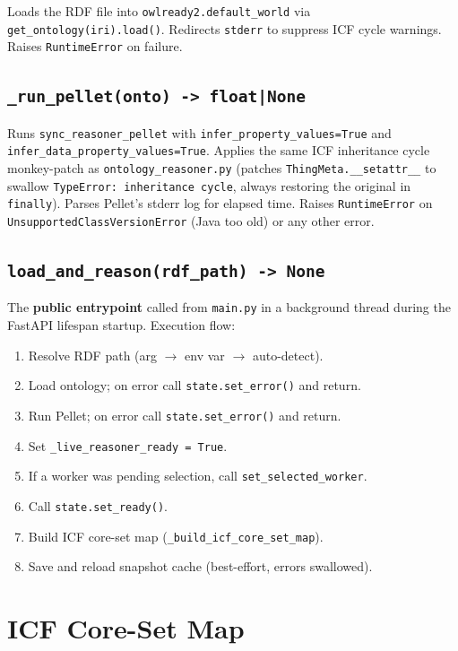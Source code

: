 ﻿\documentclass[12pt,a4paper]{article}
\begin{document}
Loads the RDF file into \texttt{owlready2.default\_world} via \texttt{get\_ontology(iri).load()}. Redirects \texttt{stderr} to suppress ICF cycle warnings. Raises \texttt{RuntimeError} on failure.

\subsection{\texttt{\_run\_pellet(onto) -> float|None}}

Runs \texttt{sync\_reasoner\_pellet} with \texttt{infer\_property\_values=True} and \texttt{infer\_data\_property\_values=True}. Applies the same ICF inheritance cycle monkey-patch as \texttt{ontology\_reasoner.py} (patches \texttt{ThingMeta.\_\_setattr\_\_} to swallow \texttt{TypeError: inheritance cycle}, always restoring the original in \texttt{finally}). Parses Pellet's stderr log for elapsed time. Raises \texttt{RuntimeError} on \texttt{UnsupportedClassVersionError} (Java too old) or any other error.

\subsection{\texttt{load\_and\_reason(rdf\_path) -> None}}

The \textbf{public entrypoint} called from \texttt{main.py} in a background thread during the FastAPI lifespan startup. Execution flow:

\begin{enumerate}[noitemsep]
  \item Resolve RDF path (arg $\to$ env var $\to$ auto-detect).
  \item Load ontology; on error call \texttt{state.set\_error()} and return.
  \item Run Pellet; on error call \texttt{state.set\_error()} and return.
  \item Set \texttt{\_live\_reasoner\_ready = True}.
  \item If a worker was pending selection, call \texttt{set\_selected\_worker}.
  \item Call \texttt{state.set\_ready()}.
  \item Build ICF core-set map (\texttt{\_build\_icf\_core\_set\_map}).
  \item Save and reload snapshot cache (best-effort, errors swallowed).
\end{enumerate}

\clearpage
\section{ICF Core-Set Map}
\end{document}
